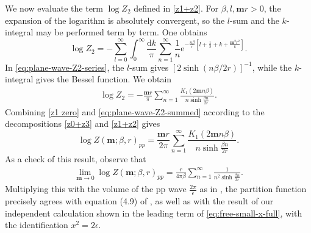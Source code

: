 \documentclass[a4paper,11pt]{article}
\newcommand{\e}{\mathrm e}
\newcommand{\dd}{\mathrm d}
\begin{document}
We now evaluate the term $\log Z_2$ defined in
\eqref{z1+z2}.  For $\beta, l , \mathbf{ m}  r>0$, the expansion of the logarithm is
absolutely convergent, so the $l$-sum and the $k$-integral may be performed
term by term.  One obtains
\begin{equation}
	\log Z_2=-\sum_{l=0}^\infty\int_0^\infty\frac{\dd k}{\pi}
	\sum_{n=1}^\infty\frac1n
	\e^{-\frac{n\beta} r[l+\frac12+k+\frac{\mathbf m^2r^2}k]}.
	\label{eq:plane-wave-Z2-series}
\end{equation}
In \eqref{eq:plane-wave-Z2-series}, the $l$-sum gives
$[2\sinh(n\beta/2 r)]^{-1}$, while the $k$-integral gives the Bessel function. 
We obtain
\begin{align}\label{eq:plane-wave-Z2-summed}
	\log Z_2=-\frac{\mathbf m r }{\pi  }
	\sum_{n=1}^\infty
	\frac{	K_1(2 \mathbf m n \beta )}{ n\sinh\frac{\beta  n}{2 r}}.
\end{align}
Combining \eqref{z1 zero} and
\eqref{eq:plane-wave-Z2-summed} 
according to the decompositions \eqref{z0+z3} and \eqref{z1+z2} gives
\begin{equation}
	\log Z(\mathbf m;\beta, r)_{pp}
	=
	\frac{\mathbf m r }{2\pi  }
	\sum_{n=1}^\infty
	\frac{	K_1(2 \mathbf m n \beta )}{ n\sinh\frac{\beta  n}{2 r}}.
	\label{eq:plane-wave-logZ-final}
\end{equation}
As a check of this result,  observe that 
\begin{eqnarray}
	\lim_{ \mathbf m \rightarrow 0}  \log Z(\mathbf m;\beta, r)_{pp} = \frac{r}{4\pi \beta}\sum_{n=1}^\infty \frac{1}{n^2 \sinh\frac{\beta  n}{2 r}}.
\end{eqnarray}
Multiplying this with the volume of the pp wave $\frac{2\pi }{\epsilon}$ as in \cite{Komargodski:2026ain}, the partition function precisely agrees with 
equation (4.9) of \cite{Komargodski:2026ain}, as well as with the result of our independent calculation shown in the leading term of \eqref{eq:free-small-x-full}, with the identification $x^2=2\epsilon$.
\end{document}
